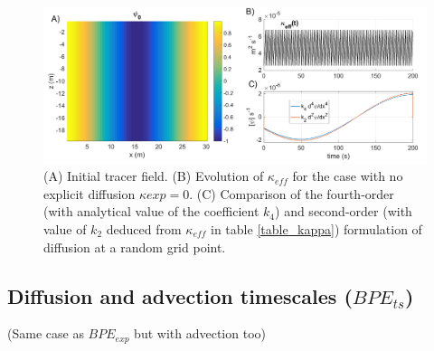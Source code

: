 \begin{figure}[h!]
\centering
\includegraphics[width=1\textwidth]{./CHAP_BPE/AGBPE_numlab5.png}
\caption{(A) Initial tracer field. (B) Evolution of $\kappa_{eff}$ for the case with no explicit diffusion $\kappa{exp}=0$. (C) Comparison of the fourth-order (with analytical value of the coefficient $k_4$) and second-order (with value of $k_2$ deduced from $\kappa_{eff}$ in table \ref{table_kappa}) formulation of diffusion at a random grid point.}
\label{fig5numlab}
\end{figure}

\subsection{Diffusion and advection timescales ($BPE_{ts}$)}

\color{red}(Same case as $BPE_{exp}$ but with advection too)\color{black}


